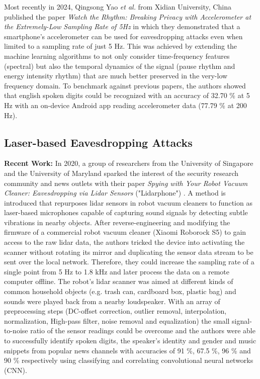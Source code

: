 \documentclass[sigconf, nonacm]{acmart}
\begin{document}
Most recently in 2024, Qingsong Yao \textit{et al.} from Xidian University, China published the paper \textit{Watch the Rhythm: Breaking Privacy with Accelerometer at the Extremely-Low Sampling Rate of 5Hz} \cite{WatchTheRhythm2024} in which they demonstrated that a smartphone's accelerometer can be used for eavesdropping attacks even when limited to a sampling rate of just 5 Hz.
This was achieved by extending the machine learning algorithms to not only consider time-frequency features (spectral) but also the temporal dynamics of the signal (pause rhythm and energy intensity rhythm) that are much better preserved in the very-low frequency domain.
To benchmark against previous papers, the authors showed that english spoken digits could be recognized with an accuracy of 32.70 \% at 5 Hz with an on-device Android app reading accelerometer data (77.79 \% at 200 Hz).

\subsection{Laser-based Eavesdropping Attacks}

\textbf{Recent Work:} In 2020, a group of researchers from the University of Singapore and the University of Maryland sparked the interest of the security research community \cite{BitdefenderRobotVacuumEavesdrop} and news outlets \cite{ForbesRobotVacuumEavesdrop} with their paper \textit{Spying with Your Robot Vacuum Cleaner: Eavesdropping via Lidar Sensors} ("Lidarphone") \cite{LidarPhone2020}. A method is introduced that repurposes lidar sensors in robot vacuum cleaners to function as laser-based microphones capable of capturing sound signals by detecting subtle vibrations in nearby objects.
After reverse-engineering and modifying the firmware of a commercial robot vacuum cleaner (Xiaomi Roborock S5) to gain access to the raw lidar data, the authors tricked the device into activating the scanner without rotating its mirror and duplicating the sensor data stream to be sent over the local network. Therefore, they could increase the sampling rate of a single point from 5 Hz to 1.8 kHz and later process the data on a remote computer offline.
The robot's lidar scanner was aimed at different kinds of common household objects (e.g. trash can, cardboard box, plastic bag) and sounds were played back from a nearby loudspeaker.
With an array of preprocessing steps (DC-offset correction, outlier removal, interpolation, normalization, High-pass filter, noise removal and equalization) the small signal-to-noise ratio of the sensor readings could be overcome and the authors were able to successfully identify spoken digits, the speaker's identity and gender and music snippets from popular news channels with accuracies of 91 \%, 67.5 \%, 96 \% and 90 \% respectively using classifying and correlating convolutional neural networks (CNN).
\end{document}

